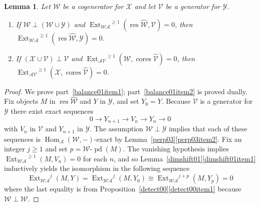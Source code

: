 \documentclass{amsart}
\newtheorem{lem}{Lemma}[section]
\begin{document}
\begin{lem} \label{balance01}
Let ${{\mathcal{{W}}}}$ be a cogenerator for ${{\mathcal{{X}}}}$ and 
let ${{\mathcal{{V}}}}$ be a generator for ${{\mathcal{{Y}}}}$.  
\begin{enumerate}[\quad\rm(a)]
\item \label{balance01item1}
If ${{\mathcal{{W}}}}\perp({{\mathcal{{W}}}}\cup{{\mathcal{{Y}}}})$ and 
${{\operatorname{Ext}}_{{{\mathcal{{W}}}} {{\mathcal{{A}}}}}}^{{\geqslant} 1}({{\operatorname{res}{\widehat{{{\mathcal{{{W}}}}}}}}},{{\mathcal{{V}}}})=0$,
then ${{\operatorname{Ext}}_{{{\mathcal{{W}}}} {{\mathcal{{A}}}}}}^{{\geqslant} 1}({{\operatorname{res}{\widehat{{{\mathcal{{{W}}}}}}}}},{{\mathcal{{Y}}}})=0$.
\item \label{balance01item2}
If $({{\mathcal{{X}}}}\cup{{\mathcal{{V}}}})\perp{{\mathcal{{V}}}}$ and 
${{\operatorname{Ext}}_{{{\mathcal{{A}}}}{{\mathcal{{V}}}}}}^{{\geqslant} 1}({{\mathcal{{W}}}},{{\operatorname{cores}{\widehat{{{\mathcal{{{V}}}}}}}}})=0$,
then ${{\operatorname{Ext}}_{{{\mathcal{{A}}}}{{\mathcal{{V}}}}}}^{{\geqslant} 1}({{\mathcal{{X}}}},{{\operatorname{cores}{\widehat{{{\mathcal{{{V}}}}}}}}})=0$.
\end{enumerate}
\end{lem}

\begin{proof}
We prove part~\eqref{balance01item1};  part~\eqref{balance01item2} is proved dually.  
Fix objects $M$ in ${{\operatorname{res}{\widehat{{{\mathcal{{{W}}}}}}}}}$ and $Y$ in ${{\mathcal{{Y}}}}$, and set $Y_0=Y$.
Because ${{\mathcal{{V}}}}$ is a generator for ${{\mathcal{{Y}}}}$ there exist exact sequences
$$0\to Y_{n+1}\to V_n\to Y_n\to0$$
with $V_n$ in ${{\mathcal{{V}}}}$ and $Y_{n+1}$ in ${{\mathcal{{Y}}}}$.  The assumption
${{\mathcal{{W}}}}\perp{{\mathcal{{Y}}}}$ implies that each of these sequences is ${{\operatorname{Hom}}_{{\mathcal{{A}}}}}({{\mathcal{{W}}}},-)$-exact
by Lemma~\ref{perp03}\eqref{perp03item2}.
Fix an integer $j{\geqslant} 1$ and set $p={{{\mathcal{{{W}}}}\text{-}{\operatorname{pd}}}}(M)$.
The vanishing hypothesis implies ${{\operatorname{Ext}}_{{{\mathcal{{W}}}} {{\mathcal{{A}}}}}}^{{\geqslant} 1}(M,V_n)=0$ for each $n$,
and so Lemma~\ref{dimshift01}\eqref{dimshift01item1} inductively
yields the isomorphism in the following sequence
$${{\operatorname{Ext}}_{{{\mathcal{{W}}}} {{\mathcal{{A}}}}}}^j(M,Y)={{\operatorname{Ext}}_{{{\mathcal{{W}}}} {{\mathcal{{A}}}}}}^j(M,Y_0)\cong{{\operatorname{Ext}}_{{{\mathcal{{W}}}} {{\mathcal{{A}}}}}}^{j+p}(M,Y_p)=0 $$
where the last equality is from Proposition~\ref{detect00}\eqref{detect00item1}
because ${{\mathcal{{W}}}}\perp{{\mathcal{{W}}}}$.
\end{proof}
\end{document}
